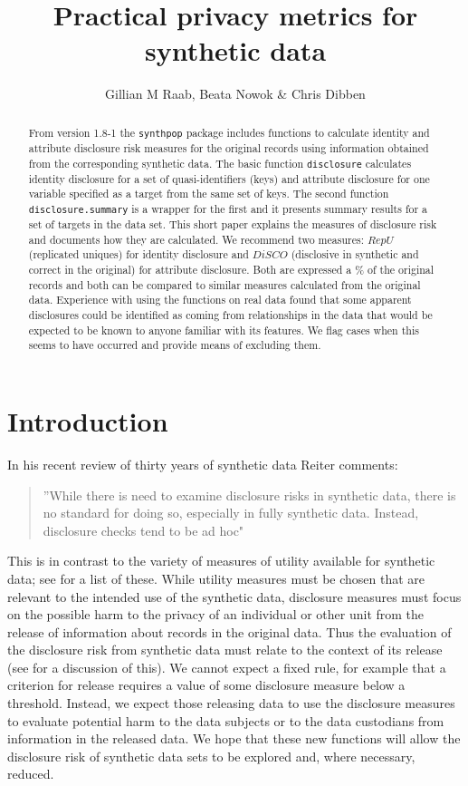 \documentclass[12pt]{article}
\title{Practical privacy metrics for synthetic data}
\author{Gillian M Raab,  Beata Nowok \& Chris Dibben}
\renewcommand{\baselinestretch}{1.5} %
\begin{document}



\maketitle
\begin{abstract}
From version 1.8-1 the \texttt{synthpop} package includes functions to calculate identity and attribute disclosure risk measures for the original records using information obtained from the corresponding synthetic data. The basic function \texttt{disclosure} calculates identity disclosure for a set of quasi-identifiers (keys) and attribute disclosure for one variable specified as a target from the same set of keys. The second function \texttt{disclosure.summary} is a wrapper for the first and it presents summary results for a set of targets in the data set. This short paper explains the measures of disclosure risk and documents how they are calculated. We recommend two measures: $RepU$ (replicated uniques) for identity
disclosure and $DiSCO$ (disclosive in synthetic and correct in the original) for attribute disclosure. Both
are expressed a \% of the original records and both can be compared to similar measures calculated from the original data.
Experience with using the functions on real data found that some apparent disclosures could be identified as coming from relationships 
in the data that would be expected to be known to anyone familiar with its features. We flag cases when this seems to have occurred and provide means of excluding them.

\end{abstract}
\section{Introduction}
\renewcommand{\baselinestretch}{1.5} 
In his recent review of thirty years of synthetic data Reiter \cite{reiter2023}
comments: 
\begin{quote}
''While there is need to examine disclosure risks in synthetic data, there is no standard for
doing so, especially in fully synthetic data. Instead, disclosure checks tend to be ad hoc"
\end{quote}
This is in contrast to the variety of measures of utility available for synthetic data; see \cite{raab2021} for a list of these. While utility measures must be chosen that are relevant to the intended use of the synthetic data, disclosure measures must focus on the possible harm to the privacy of an individual or other unit from the release of information about records in the original  data. Thus the evaluation of the disclosure risk from synthetic data must relate to the context of its release (see \cite{elliot_anonframe} for a discussion of this). We cannot expect a fixed rule, for example that a criterion for release requires a value of some disclosure measure below a threshold. Instead, we expect those releasing data to use the disclosure measures to evaluate potential harm to the data subjects or to the data custodians from information in the released data. We hope that these new functions will allow the disclosure risk of synthetic data sets to be explored and, where necessary, reduced. 
\end{document}
